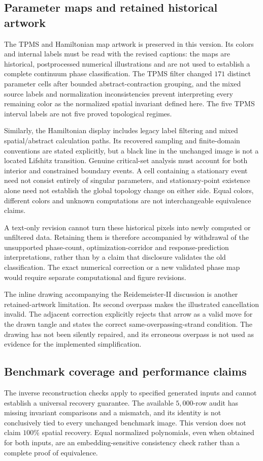 \documentclass[10pt,twocolumn]{article}
\begin{document}
\subsection{Parameter maps and retained historical artwork}
\label{supp:limitations_maps}
The TPMS and Hamiltonian map artwork is preserved in this version. Its colors and internal labels must be read with the revised captions: the maps are historical, postprocessed numerical illustrations and are not used to establish a complete continuum phase classification. The TPMS filter changed $171$ distinct parameter cells after bounded abstract-contraction grouping, and the mixed source labels and normalization inconsistencies prevent interpreting every remaining color as the normalized spatial invariant defined here. The five TPMS interval labels are not five proved topological regimes.

Similarly, the Hamiltonian display includes legacy label filtering and mixed spatial/abstract calculation paths. Its recovered sampling and finite-domain conventions are stated explicitly, but a black line in the unchanged image is not a located Lifshitz transition. Genuine critical-set analysis must account for both interior and constrained boundary events. A cell containing a stationary event need not consist entirely of singular parameters, and stationary-point existence alone need not establish the global topology change on either side. Equal colors, different colors and unknown computations are not interchangeable equivalence claims.

A text-only revision cannot turn these historical pixels into newly computed or unfiltered data. Retaining them is therefore accompanied by withdrawal of the unsupported phase-count, optimization-corridor and response-prediction interpretations, rather than by a claim that disclosure validates the old classification. The exact numerical correction or a new validated phase map would require separate computational and figure revisions.

The inline drawing accompanying the Reidemeister-II discussion is another retained-artwork limitation. Its second overpass makes the illustrated cancellation invalid. The adjacent correction explicitly rejects that arrow as a valid move for the drawn tangle and states the correct same-overpassing-strand condition. The drawing has not been silently repaired, and its erroneous overpass is not used as evidence for the implemented simplification.

\subsection{Benchmark coverage and performance claims}
\label{supp:limitations_performance}
The inverse reconstruction checks apply to specified generated inputs and cannot establish a universal recovery guarantee. The available $5{,}000$-row audit has missing invariant comparisons and a mismatch, and its identity is not conclusively tied to every unchanged benchmark image. This version does not claim $100\%$ spatial recovery. Equal normalized polynomials, even when obtained for both inputs, are an embedding-sensitive consistency check rather than a complete proof of equivalence.
\end{document}

